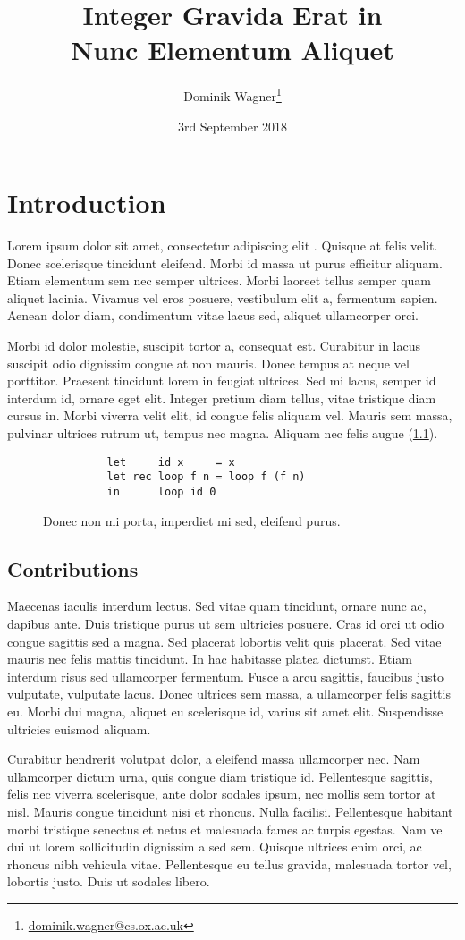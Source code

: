 \documentclass[a4paper,twoside,notitlepage,openright,11pt]{report}
\title{Integer Gravida Erat in\\Nunc Elementum Aliquet}
\author{Dominik Wagner\ifdraft\thanks{\href{mailto:dominik.wagner@cs.ox.ac.uk}{dominik.wagner@cs.ox.ac.uk}}\else\fi}
\date{3rd September 2018}
\begin{document}


\chapter{Introduction}
Lorem ipsum dolor sit amet, consectetur adipiscing elit \cite{C45}. Quisque at felis velit. Donec scelerisque tincidunt eleifend. Morbi id massa ut purus efficitur aliquam. Etiam elementum sem nec semper ultrices. Morbi laoreet tellus semper quam aliquet lacinia. Vivamus vel eros posuere, vestibulum elit a, fermentum sapien. Aenean dolor diam, condimentum vitae lacus sed, aliquet ullamcorper orci.

Morbi id dolor molestie, suscipit tortor a, consequat est. Curabitur in lacus suscipit odio dignissim congue at non mauris. Donec tempus at neque vel porttitor. Praesent tincidunt lorem in feugiat ultrices. Sed mi lacus, semper id interdum id, ornare eget elit. Integer pretium diam tellus, vitae tristique diam cursus in. Morbi viverra velit elit, id congue felis aliquam vel. Mauris sem massa, pulvinar ultrices rutrum ut, tempus nec magna. Aliquam nec felis augue (\cref{fig:prgm}).
\begin{figure}[t]
  \centering
  \begin{lstlisting}
          let     id x     = x
          let rec loop f n = loop f (f n)
          in      loop id 0
  \end{lstlisting}
  \caption{Donec non mi porta, imperdiet mi sed, eleifend purus.}
  \label{fig:prgm}
\end{figure}

\section{Contributions}

Maecenas iaculis interdum lectus. Sed vitae quam tincidunt, ornare nunc ac, dapibus ante. Duis tristique purus ut sem ultricies posuere. Cras id orci ut odio congue sagittis sed a magna. Sed placerat lobortis velit quis placerat. Sed vitae mauris nec felis mattis tincidunt. In hac habitasse platea dictumst. Etiam interdum risus sed ullamcorper fermentum. Fusce a arcu sagittis, faucibus justo vulputate, vulputate lacus. Donec ultrices sem massa, a ullamcorper felis sagittis eu. Morbi dui magna, aliquet eu scelerisque id, varius sit amet elit. Suspendisse ultricies euismod aliquam.

Curabitur hendrerit volutpat dolor, a eleifend massa ullamcorper nec. Nam ullamcorper dictum urna, quis congue diam tristique id. Pellentesque sagittis, felis nec viverra scelerisque, ante dolor sodales ipsum, nec mollis sem tortor at nisl. Mauris congue tincidunt nisi et rhoncus. Nulla facilisi. Pellentesque habitant morbi tristique senectus et netus et malesuada fames ac turpis egestas. Nam vel dui ut lorem sollicitudin dignissim a sed sem. Quisque ultrices enim orci, ac rhoncus nibh vehicula vitae. Pellentesque eu tellus gravida, malesuada tortor vel, lobortis justo. Duis ut sodales libero.
\end{document}
